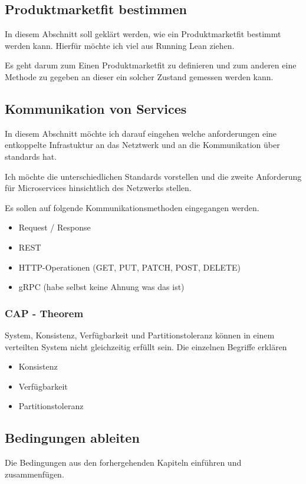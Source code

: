 \subsection{Produktmarketfit bestimmen}

In diesem Abschnitt soll geklärt werden, wie ein Produktmarketfit bestimmt werden kann. Hierfür möchte ich viel aus Running Lean ziehen.

Es geht darum zum Einen Produktmarketfit zu definieren und zum anderen eine Methode zu gegeben an dieser ein solcher Zustand gemessen werden kann.

\subsection{Kommunikation von Services}

In diesem Abschnitt möchte ich darauf eingehen welche anforderungen eine entkoppelte Infrastuktur an das Netztwerk und an die Kommunikation über standards hat.

Ich möchte die unterschiedlichen Standards vorstellen und die zweite Anforderung für Microservices hinsichtlich des Netzwerks stellen.

Es sollen auf folgende Kommunikationsmethoden eingegangen werden.
\begin{itemize}
	\item Request / Response
	\item REST
	\item HTTP-Operationen (GET, PUT, PATCH, POST, DELETE)
	\item gRPC (habe selbst keine Ahnung was das ist)
\end{itemize}

\subsubsection{CAP - Theorem}

System, Konsistenz, Verfügbarkeit und Partitionstoleranz können in einem verteilten System nicht gleichzeitig erfüllt sein.
Die einzelnen Begriffe erklären \begin{itemize}
	\item Konsistenz
	\item Verfügbarkeit
	\item Partitionstoleranz
\end{itemize}

\subsection{Bedingungen ableiten}

Die Bedingungen aus den forhergehenden Kapiteln einführen und zusammenfügen.
